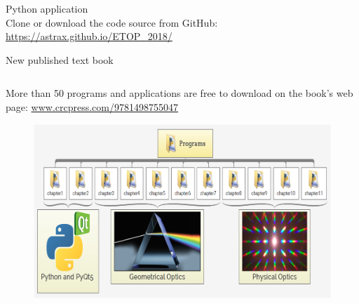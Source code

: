 \documentclass[serif ,mathserif, 8pt]{beamer}
\begin{document}
\begin{frame}{Python application}
	\centering
	\\
	Clone or download the code source from GitHub:\\
	\url{https://astrax.github.io/ETOP_2018/}	
\end{frame}


\begin{frame}{New published text book}
\begin{columns}[c]
	\begin{column}{0.6\textwidth}
		More than 50 programs and applications are free to download on the book's web page: \url{www.crcpress.com/9781498755047}
		
		\begin{figure}
			\includegraphics[width=\linewidth]{images/Image4}
			
		\end{figure}
		

\end{column}
\end{columns}
\end{frame}
\end{document}
